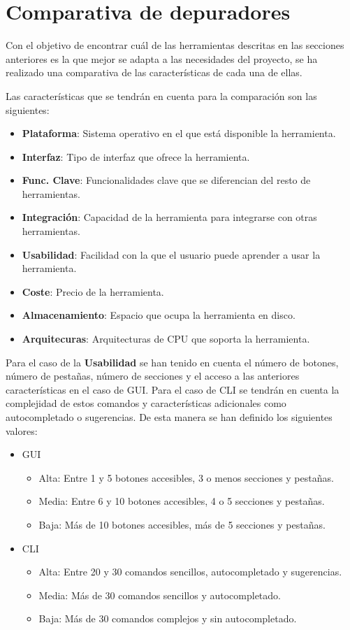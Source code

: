 \section{Comparativa de depuradores}\label{sec:comparativa-depuradores}
Con el objetivo de encontrar cuál de las herramientas descritas en las secciones anteriores es la que mejor se adapta a las necesidades del proyecto, se ha realizado una comparativa de las características de cada una de ellas. 

Las características que se tendrán en cuenta para la comparación son las siguientes:
\begin{itemize}
  \item \textbf{Plataforma}: Sistema operativo en el que está disponible la herramienta.
  \item \textbf{Interfaz}: Tipo de interfaz que ofrece la herramienta.
  \item \textbf{Func. Clave}: Funcionalidades clave que se diferencian del resto de herramientas.
  \item \textbf{Integración}: Capacidad de la herramienta para integrarse con otras herramientas.
  \item \textbf{Usabilidad}: Facilidad con la que el usuario puede aprender a usar la herramienta.
  \item \textbf{Coste}: Precio de la herramienta.
  \item \textbf{Almacenamiento}: Espacio que ocupa la herramienta en disco.
  \item \textbf{Arquitecuras}: Arquitecturas de \gls{CPU} que soporta la herramienta.
\end{itemize}

Para el caso de la \textbf{Usabilidad} se han tenido en cuenta el número de botones, número de pestañas, número de secciones y el acceso a las anteriores características en el caso de \gls{GUI}. Para el caso de \gls{CLI} se tendrán en cuenta la complejidad de estos comandos y características adicionales como autocompletado o sugerencias. De esta manera se han definido los siguientes valores:
\begin{itemize}
    \item \gls{GUI}
        \begin{itemize}
            \item Alta: Entre 1 y 5 botones accesibles, 3 o menos secciones y pestañas.
            \item Media: Entre 6 y 10 botones accesibles, 4 o 5 secciones y pestañas.
            \item Baja: Más de 10 botones accesibles, más de 5 secciones y pestañas.
        \end{itemize}
    \item \gls{CLI}
        \begin{itemize}
            \item Alta: Entre 20 y 30 comandos sencillos, autocompletado y sugerencias.
            \item Media: Más de 30 comandos sencillos y autocompletado.
            \item Baja: Más de 30 comandos complejos y sin autocompletado.
        \end{itemize}
\end{itemize}


